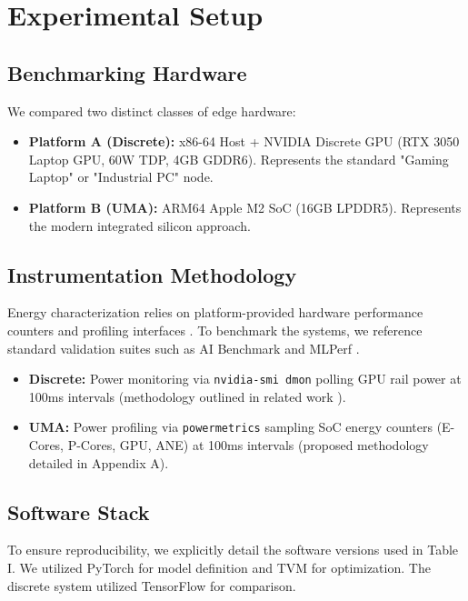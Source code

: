 \documentclass[conference]{IEEEtran}
\begin{document}
\section{Experimental Setup}

\subsection{Benchmarking Hardware}
We compared two distinct classes of edge hardware:
\begin{itemize}
    \item \textbf{Platform A (Discrete):} x86-64 Host + NVIDIA Discrete GPU (RTX 3050 Laptop GPU, 60W TDP, 4GB GDDR6). Represents the standard "Gaming Laptop" or "Industrial PC" node.
    \item \textbf{Platform B (UMA):} ARM64 Apple M2 SoC (16GB LPDDR5). Represents the modern integrated silicon approach.
\end{itemize}

\subsection{Instrumentation Methodology}
Energy characterization relies on platform-provided hardware performance counters and profiling interfaces \cite{b4}. To benchmark the systems, we reference standard validation suites such as AI Benchmark \cite{b14} and MLPerf \cite{b30}.
\begin{itemize}
    \item \textbf{Discrete:} Power monitoring via \texttt{nvidia-smi dmon} polling GPU rail power at 100ms intervals (methodology outlined in related work \cite{b21}).
    \item \textbf{UMA:} Power profiling via \texttt{powermetrics} sampling SoC energy counters (E-Cores, P-Cores, GPU, ANE) at 100ms intervals (proposed methodology detailed in Appendix A).
\end{itemize}

\subsection{Software Stack}
To ensure reproducibility, we explicitly detail the software versions used in Table I. We utilized PyTorch \cite{b13} for model definition and TVM \cite{b9} for optimization. The discrete system utilized TensorFlow \cite{b40} for comparison.
\end{document}
